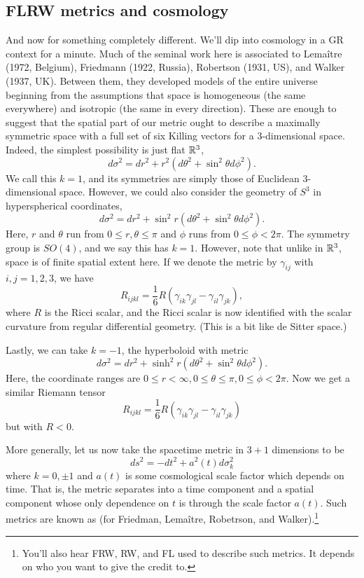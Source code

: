 \subsection*{FLRW metrics and cosmology} And now for something completely different. We'll dip into cosmology in a GR context for a minute. Much of the seminal work here is associated to Lema\^itre (1972, Belgium), Friedmann (1922, Russia), Robertson (1931, US), and Walker (1937, UK). Between them, they developed models of the entire universe beginning from the assumptions that space is homogeneous (the same everywhere) and isotropic (the same in every direction). These are enough to suggest that the spatial part of our metric ought to describe a maximally symmetric space with a full set of six Killing vectors for a 3-dimensional space. Indeed, the simplest possibility is just flat $\mathbb{R}^3$,
$$d\sigma^2=dr^2+r^2(d\theta^2+\sin^2\theta d\phi^2).$$
We call this $k=1$, and its symmetries are simply those of Euclidean 3-dimensional space. However, we could also consider the geometry of $S^3$ in hyperspherical coordinates,
$$d\sigma^2=dr^2+\sin^2 r(d\theta^2+\sin^2\theta d\phi^2).$$ Here, $r$ and $\theta$ run from $0\leq r,\theta\leq \pi$ and $\phi$ runs from $0\leq \phi < 2\pi$. The symmetry group is $SO(4)$, and we say this has $k=1$. However, note that unlike in $\mathbb{R}^3$, space is of finite spatial extent here. If we denote the metric by $\gamma_{ij}$ with $i,j=1,2,3$, we have
$$R_{ijkl}=\frac{1}{6}R(\gamma_{ik}\gamma_{jl}-\gamma_{il}\gamma_{jk}),$$
where $R$ is the Ricci scalar, and the Ricci scalar is now identified with the scalar curvature from regular differential geometry. (This is a bit like de Sitter space.)

Lastly, we can take $k=-1$, the hyperboloid with metric $$d\sigma^2=dr^2+\sinh^2 r (d\theta^2 +\sin^2\theta d\phi^2).$$
Here, the coordinate ranges are $0\leq r < \infty, 0\leq \theta \leq \pi, 0\leq \phi < 2\pi.$ Now we get a similar Riemann tensor
$$R_{ijkl}=\frac{1}{6}R(\gamma_{ik}\gamma_{jl}-\gamma_{il}\gamma_{jk})$$
but with $R<0.$

\begin{defn}
More generally, let us now take the spacetime metric in $3+1$ dimensions to be
$$ds^2=-dt^2+a^2(t) d\sigma_k^2$$
where $k=0,\pm 1$ and $a(t)$ is some cosmological scale factor which depends on time. That is, the metric separates into a time component and a spatial component whose only dependence on $t$ is through the scale factor $a(t)$. Such metrics are known as  (for Friedman, Lema\^itre, Robetrson, and Walker).\footnote{You'll also hear FRW, RW, and FL used to describe such metrics. It depends on who you want to give the credit to.}
\end{defn}

